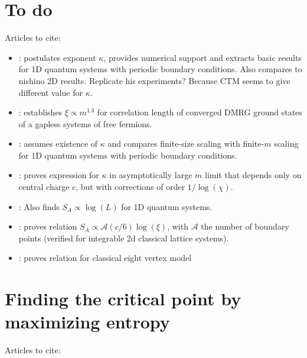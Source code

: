 \section{To do}

Articles to cite:

\begin{itemize}

\item \cite{tagliacozzo2008scaling}: postulates exponent $\kappa$, provides numerical support and extracts basic results
for 1D quantum systems with periodic boundary conditions. Also compares to nishino 2D results. Replicate his
experiments? Because CTM seems to give different value for $\kappa$.
\item \cite{andersson1999density}: establishes $\xi \propto m^{1.3}$ for correlation length of converged DMRG ground
states of a gapless systems of free fermions.
\item \cite{pirvu2012matrix}: assumes existence of $\kappa$ and compares finite-size scaling with finite-$m$ scaling
for 1D quantum systems with periodic boundary conditions.
\item \cite{pollmann2009theory}: proves expression for $\kappa$ in asymptotically large $m$ limit that depends only on
central charge $c$, but with corrections of order $1 / \log(\chi)$.
\item \cite{vidal2003entanglement}: Also finds $S_A \propto \log(L)$ for 1D quantum systems.
\item \cite{calabrese2004entanglement}: proves relation $S_A \propto \mathcal{A}(c/6)\log(\xi)$, with $\mathcal{A}$
the number of boundary points (verified for integrable 2d classical lattice systems).
\item \cite{ercolessi2010exact}: proves relation for classical eight vertex model
\end{itemize}




\section{Finding the critical point by maximizing entropy}

Articles to cite:

